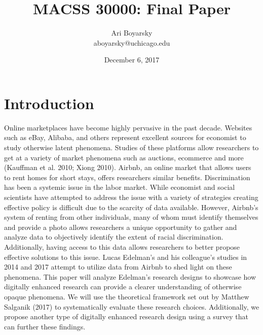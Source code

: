 \documentclass[dvips,12pt]{article}
\newcounter{choice}
\begin{document}

\title{MACSS 30000: Final Paper}
\author{Ari Boyarsky \\ aboyarsky@uchicago.edu}
\date{December 6, 2017}



\maketitle


\section{Introduction}
Online marketplaces have become highly pervasive in the past decade. Websites such as eBay, Alibaba, and others represent excellent sources for economist to study otherwise latent phenomena. Studies of these platforms allow researchers to get at a variety of market phenomena such as auctions, ecommerce and more (Kauffman et al. 2010; Xiong 2010). Airbnb, an online market that allows users to rent homes for short stays, offers researchers similar benefits. Discrimination has been a systemic issue in the labor market. While economist and social scientists have attempted to address the issue with a variety of strategies creating effective policy is difficult due to the scarcity of data available. However, Airbnb’s system of renting from other individuals, many of whom must identify themselves and provide a photo allows researchers a unique opportunity to gather and analyze data to objectively identify the extent of racial discrimination. Additionally, having access to this data allows researchers to better propose effective solutions to this issue. Lucas Edelman’s and his colleague’s studies in 2014 and 2017 attempt to utilize data from Airbnb to shed light on these phenomena. This paper will analyze Edelman’s research designs to showcase how digitally enhanced research can provide a clearer understanding of otherwise opaque phenomena. We will use the theoretical framework set out by Matthew Salganik (2017) to systematically evaluate these research choices. Additionally, we propose another type of digitally enhanced research design using a survey that can further these findings.
\end{document}
